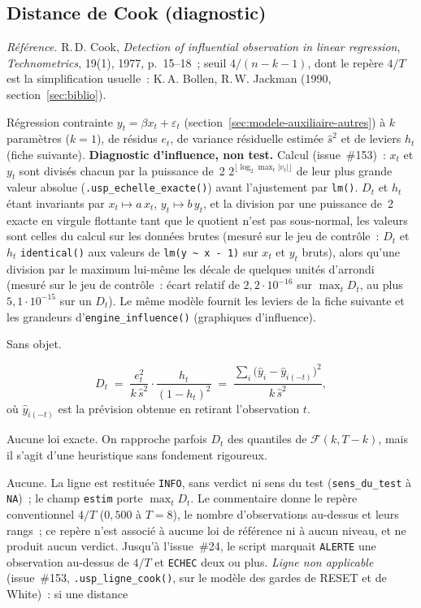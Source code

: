 \documentclass[a4paper,11pt]{article}
\newcommand{\code}[1]{\texttt{\small #1}}
\newcommand{\refl}[1]{{\small\textcolor{maincolor!70!black}{\textit{Référence.} #1}}\par\smallskip}
\newcounter{ficheid}
\newenvironment{fiche}[1]{%
  \stepcounter{ficheid}%
  \phantomsection
  \subsection{#1}%
  \label{fiche:\theficheid}%
}{%
  \end{description}\vspace{0.5em}%
}
\newcommand{\Cadre}{%
  \begin{description}[leftmargin=0pt, style=unboxed, itemsep=3pt, topsep=3pt, parsep=2pt]%
  \item[\textcolor{financeblue}{\textbf{1. Cadre, notations et hypothèses de validité (non testées).}}]}
\newcommand{\Hzero}{\item[\textcolor{financeblue}{\textbf{2. Hypothèse nulle.}}]}
\newcommand{\Stat}{\item[\textcolor{financeblue}{\textbf{3. Statistique de test.}}]}
\newcommand{\Loi}{\item[\textcolor{financeblue}{\textbf{4. Loi sous $H_0$.}}]}
\newcommand{\Pval}{\item[\textcolor{financeblue}{\textbf{5. p-value.}}]}
\begin{document}
\begin{fiche}{Distance de Cook (diagnostic)}
\label{fiche:cook}%
\refl{R.\,D. Cook, \emph{Detection of influential observation in linear regression},
\emph{Technometrics}, 19(1), 1977, p.~15--18~; seuil $4/(n-k-1)$, dont le repère $4/T$ est la
simplification usuelle~: K.\,A. Bollen, R.\,W. Jackman (1990, section~\ref{sec:biblio}).}
\Cadre
Régression contrainte $y_t = \beta x_t + \varepsilon_t$ (section~\ref{sec:modele-auxiliaire-autres}) à $k$ paramètres ($k=1$), de résidus
$e_t$, de variance résiduelle estimée $\hat s^2$ et de leviers $h_t$ (fiche suivante).
\textbf{Diagnostic d'influence, non test.} Calcul (issue~\#153)~: $x_t$ et $y_t$ sont divisés
chacun par la puissance de~2 $2^{\lfloor \log_2 \max_t |v_t| \rfloor}$ de leur plus grande valeur
absolue (\code{.usp\_echelle\_exacte()}) avant l'ajustement par \code{lm()}. $D_t$ et $h_t$ étant
invariants par $x_t \mapsto a\,x_t$, $y_t \mapsto b\,y_t$, et la division par une puissance de~2
exacte en virgule flottante tant que le quotient n'est pas sous-normal, les valeurs sont celles
du calcul sur les données brutes (mesuré sur le jeu de contrôle~: $D_t$ et $h_t$
\code{identical()} aux valeurs de \code{lm(y \textasciitilde\ x - 1)} sur $x_t$ et $y_t$ bruts),
alors qu'une division par le maximum lui-même les décale de quelques unités d'arrondi (mesuré sur
le jeu de contrôle~: écart relatif de $2{,}2\cdot 10^{-16}$ sur $\max_t D_t$, au plus
$5{,}1\cdot 10^{-15}$ sur un $D_t$). Le même
modèle fournit les leviers de la fiche suivante et les grandeurs d'\code{engine\_influence()}
(graphiques d'influence).
\Hzero
Sans objet.
\Stat
\[
  D_t \;=\; \frac{e_t^2}{k\,\hat s^2}\cdot\frac{h_t}{(1-h_t)^2}
  \;=\; \frac{\sum_{i}\big(\hat y_i - \hat y_{i(-t)}\big)^2}{k\,\hat s^2},
\]
où $\hat y_{i(-t)}$ est la prévision obtenue en retirant l'observation $t$.
\Loi
Aucune loi exacte. On rapproche parfois $D_t$ des quantiles de $\mathcal{F}(k, T-k)$, mais il
s'agit d'une heuristique sans fondement rigoureux.
\Pval
Aucune. La ligne est restituée \code{INFO}, sans verdict ni sens du test
(\code{sens\_du\_test} à \code{NA})~; le champ \code{estim} porte $\max_t D_t$. Le commentaire donne
le repère conventionnel $4/T$ ($0{,}500$ à $T = 8$), le nombre d'observations au-dessus et leurs
rangs~; ce repère n'est associé à aucune loi de référence ni à aucun niveau, et ne produit aucun
verdict. Jusqu'à l'issue~\#24, le script marquait \code{ALERTE} une observation au-dessus de
$4/T$ et \code{ECHEC} deux ou plus. \emph{Ligne non applicable} (issue~\#153,
\code{.usp\_ligne\_cook()}, sur le modèle des gardes de RESET et de White)~: si une distance

\end{fiche}
\end{document}
